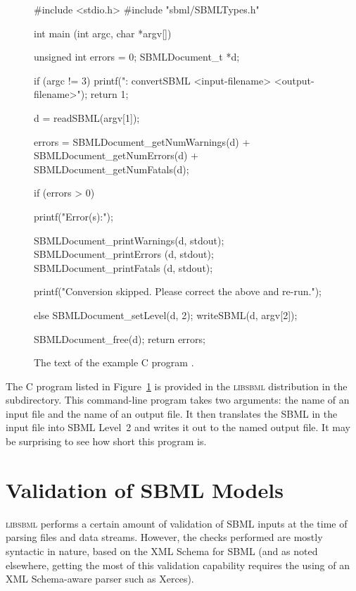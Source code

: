 \documentclass{sbmlmanual}
\newcommand{\libsbml}{\textsc{libsbml}}
\begin{document}
\begin{figure}[bth]
  \begin{codeVerbatim}[C,flexiblecolumns=false]
#include <stdio.h>
#include "sbml/SBMLTypes.h"

int
main (int argc, char *argv[])
{
  unsigned int errors = 0;
  SBMLDocument_t *d;

  if (argc != 3)
  {
    printf("\nusage: convertSBML <input-filename> <output-filename>\n\n");
    return 1;
  }

  d = readSBML(argv[1]);

  errors = SBMLDocument_getNumWarnings(d) + SBMLDocument_getNumErrors(d) +
           SBMLDocument_getNumFatals(d);

  if (errors > 0)
  {
    printf("Error(s):\n");

    SBMLDocument_printWarnings(d, stdout);
    SBMLDocument_printErrors  (d, stdout);
    SBMLDocument_printFatals  (d, stdout);

    printf("Conversion skipped.  Please correct the above and re-run.\n");
  }
  else
  {
    SBMLDocument_setLevel(d, 2);
    writeSBML(d, argv[2]);
  }

  SBMLDocument_free(d);
  return errors;
}
  \end{codeVerbatim}
  \caption{The text of the example C program .}
  \label{fig:convert-sbml}
\end{figure}


The C program listed in Figure~\ref{fig:convert-sbml} is provided in the
\libsbml{} distribution in the  subdirectory.  This
command-line program takes two arguments: the name of an input file and the
name of an output file.  It then translates the SBML in the input file into
SBML Level~2 and writes it out to the named output file.  It may be
surprising to see how short this program is.


\section{Validation of SBML Models}
\label{sec:sbml-validation}

\libsbml{} performs a certain amount of validation of SBML inputs at the
time of parsing files and data streams.  However, the checks performed are
mostly syntactic in nature, based on the XML Schema for SBML (and as noted
elsewhere, getting the most of this validation capability requires the
using of an XML Schema-aware parser such as Xerces).
\end{document}
